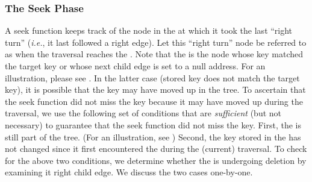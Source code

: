 \subsubsection{The Seek Phase}
A seek function keeps track of the node in the \accesspath{} at which it took the last ``right turn'' (\emph{i.e.}, it last followed a right edge). Let this ``right turn'' node be referred to as \emph{\anchornode} when the traversal reaches the \terminalnode{}. Note that the \terminalnode{} is the node whose key matched the target key or whose next child edge is set to a null address. For an illustration, please see . In the latter case (stored key does not match the target key), it is possible that the key may have moved up in the tree. To ascertain that the seek function did not miss the key because it may have moved up during the traversal, we use the following set of conditions that are \emph{sufficient} (but not necessary) to guarantee that the seek function did not miss the key. First, the \anchornode{} is still part of the tree. (For an illustration, see ) Second, the key stored in the \anchornode{} has not changed since it first encountered the \anchornode{} during the (current) traversal. To check for the above two conditions, we determine whether the \anchornode{} is undergoing deletion by examining it right child edge. We discuss the two cases one-by-one.


